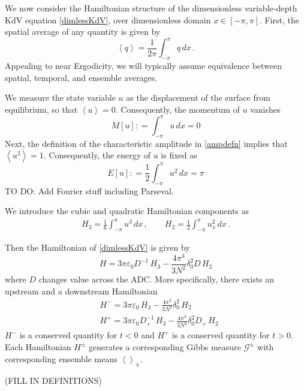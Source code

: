 \documentclass[11pt]{article}
\newcommand{\vsp}[1]{\vspace{#1 pc} \noindent}
\newcommand{\mean}[1]{\left< #1 \right>}
\newcommand{\eps}{\varepsilon}
\newcommand{\defeq}{\mathrel{\mathop:}=}
\newcommand{\lamfac}{N}
\newcommand{\drat}{D}
\newcommand{\dratdn}{\drat_+}
\newcommand{\epsup}{\eps_0}
\newcommand{\delup}{\delta_0}
\newcommand{\Ham}{H}
\newcommand{\Hup}{\Ham^{-}}
\newcommand{\Hdn}{\Ham^{+}}
\newcommand{\Gibbs}{\mathcal{G}}
\newcommand{\dx}{\, dx}
\begin{document}
We now consider the Hamiltonian structure of the dimensionless variable-depth KdV equation \eqref{dimlessKdV}, over dimensionless domain $x \in [-\pi,\pi]$. First, the spatial average of any quantity is given by
\begin{equation}
\mean{q} = \frac{1}{2\pi} \int_{-\pi}^{\pi} q \dx \, .
\end{equation}
Appealing to near Ergodicity, we will typically assume equivalence between spatial, temporal, and ensemble averages. 

We measure the state variable $u$ as the displacement of the surface from equilibrium, so that $\mean{u} = 0$. Consequently, the momentum of $u$ vanishes
\begin{equation}
M[u] \defeq \int_{-\pi}^{\pi} u \dx = 0
\end{equation}
Next, the definition of the characteristic amplitude in \eqref{ampdefn} implies that $\mean{u^2} = 1$. Consequently, the energy of $u$ is fixed as
\begin{equation}
E[u] \defeq \frac{1}{2} \int_{-\pi}^{\pi} u^2 \dx = \pi
\end{equation}
TO DO: Add Fourier stuff including Parseval.
\vsp{4}

We introduce the cubic and quadratic Hamiltonian components as
\begin{align}
H_3 = \frac{1}{6} \int_{-\pi}^{\pi} u^3 \dx	\, , \qquad
H_2 = \frac{1}{2} \int_{-\pi}^{\pi} u_x^2 \dx	\, .
\end{align}

Then the Hamiltonian of \eqref{dimlessKdV} is given by
\begin{equation}
\Ham = 3 \pi \epsup \drat^{-1} \, H_3 - \frac{4 \pi^3}{3 \lamfac^2} \delup^2 \drat \, H_2
\end{equation}
where $\drat$ changes value across the ADC. More specifically, there exists an upstream and a downstream Hamiltonian
\begin{align}
&\Hup = 3 \pi \epsup \, H_3 - \frac{4 \pi^3}{3 \lamfac^2} \delup^2 \, H_2 \\
&\Hdn = 3 \pi \epsup \dratdn^{-1} \, H_3 - \frac{4 \pi^3}{3 \lamfac^2} \delup^2 \dratdn \, H_2
\end{align}
$\Hup$ is a conserved quantity for $t<0$ and $\Hdn$ is a conserved quantity for $t>0$. Each Hamiltonian $\Ham^{\pm}$ generates a corresponding Gibbs measure $\Gibbs^{\pm}$ with corresponding ensemble means $\mean{}_{\pm}$. 

(FILL IN DEFINITIONS)


\end{document}

